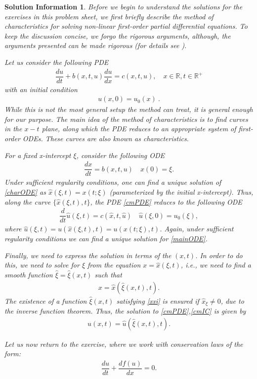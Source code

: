\documentclass[10pt,letterpaper]{article}
\newcommand{\frb}[1]{ \left(  {#1} \right) }
\theoremstyle{break}
\newtheorem*{solutioninformation}{Solution Information}
\begin{document}
\begin{solutioninformation}
	Before we begin to understand the solutions for the exercises in this problem sheet, we first briefly describe the method of characteristics for solving non-linear first-order partial differential equations. To keep the discussion concise, we forgo the rigorous arguments, although, the arguments presented can be made rigorous (for details see \cite{Evans,Fritz}).

	Let us consider the following PDE
	\begin{gather} \label{cmPDE}
		\dfrac{du}{dt}+b\frb{x,t,u} \dfrac{du}{dx}=c\frb{x,t,u}, \quad x \in \mathbb{R}, t \in \mathbb{R}^+
	\end{gather}
	with an initial condition
	\begin{gather} \label{cmIC}
		u(x,0)=u_0(x)\ .
	\end{gather}
	While this is not the most general setup the method can treat, it is general enough for our purpose. The main idea of the method of characteristics is to find curves in the $x-t$ plane, along which the PDE reduces to an appropriate system of first-order ODEs. These curves are also known as \textit{characteristics}. 

	For a fixed x-intercept $\xi$, consider the following ODE
	\begin{gather} \label{charODE}
		\dfrac{dx}{dt} =b\frb{x,t,u}
		\quad
		x(0) = \xi.
	\end{gather}
	Under sufficient regularity conditions, one can find a unique solution of \eqref{charODE} as $\hat x (\xi,t) = x(t;\xi)$ (parameterized by the initial x-intercept). Thus, along the curve $\{\hat x (\xi,t), t\}$, the PDE \eqref{cmPDE} reduces to the following ODE
	\begin{gather} \label{mainODE}
		\dfrac{d}{dt}\hat u \frb{\xi,t}=c\frb{\hat x,t,\hat u} \quad \hat u\frb{\xi,0}=u_0\frb{\xi},
	\end{gather}
	where $\hat u(\xi,t) = u( \hat x(\xi,t),t) = u( x(t;\xi),t)$. Again, under sufficient regularity conditions we can find a unique solution for \eqref{mainODE}.

	Finally, we need to express the solution in terms of the $(x,t)$. In order to do this, we need to solve for $\xi$ from the equation $x = \hat x\frb{\xi,t}$, i.e., we need to find a smooth function $\hat \xi=\hat \xi(x,t)$ such that
	\begin{gather} \label{xxi}
		x=\hat x\frb{\hat \xi(x,t),t}.
	\end{gather}
	The existence of a function $\hat \xi(x,t)$ satisfying \eqref{xxi} is ensured if $\hat x_\xi\ne0$, due to the inverse function theorem. Thus, the solution to \eqref{cmPDE},\eqref{cmIC} is given by
	\begin{gather} \label{cmSol}
		u(x,t)=\hat u\frb{\hat \xi(x,t) ,t}.
	\end{gather}

	Let us now return to the exercise, where we work with conservation laws of the form:
	\begin{gather} 
		\dfrac{du}{dt}+\dfrac{d f(u)}{dx}=0.
	\end{gather}
\end{solutioninformation}
\end{document}

